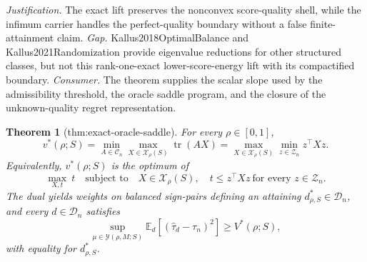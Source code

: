 \documentclass{article}
\newtheorem{theorem}{Theorem}
\begin{document}
\par\smallskip\noindent \textit{Justification.} The exact lift preserves the nonconvex score-quality shell, while the infimum carrier handles the perfect-quality boundary without a false finite-attainment claim. \textit{Gap.} Kallus2018OptimalBalance and Kallus2021Randomization provide eigenvalue reductions for other structured classes, but not this rank-one-exact lower-score-energy lift with its compactified boundary. \textit{Consumer.} The theorem supplies the scalar slope used by the admissibility threshold, the oracle saddle program, and the closure of the unknown-quality regret representation.

\begin{theorem}[thm:exact-oracle-saddle]\label{thm:exact-oracle-saddle}
For every \(\rho\in[0,1]\), \[v^*(\rho;S)=\min_{A\in\mathcal C_n}\max_{X\in\mathcal X_\rho(S)}\operatorname{tr}(AX)=\max_{X\in\mathcal X_\rho(S)}\min_{z\in\mathcal Z_n}z^\top Xz.\] Equivalently, \(v^*(\rho;S)\) is the optimum of \[\max_{X,t}\ t\quad\text{subject to}\quad X\in\mathcal X_\rho(S),\quad t\leq z^\top Xz\ \text{for every }z\in\mathcal Z_n.\] The dual yields weights on balanced sign-pairs defining an attaining \(d^*_{\rho,S}\in\mathcal D_n\), and every \(d\in\mathcal D_n\) satisfies \[\sup_{\mu\in\mathcal Y(\rho,M;S)}\mathbb E_d[(\widehat\tau_d-\tau_n)^2]\geq V^*(\rho;S),\] with equality for \(d^*_{\rho,S}\).
\end{theorem}
\end{document}
